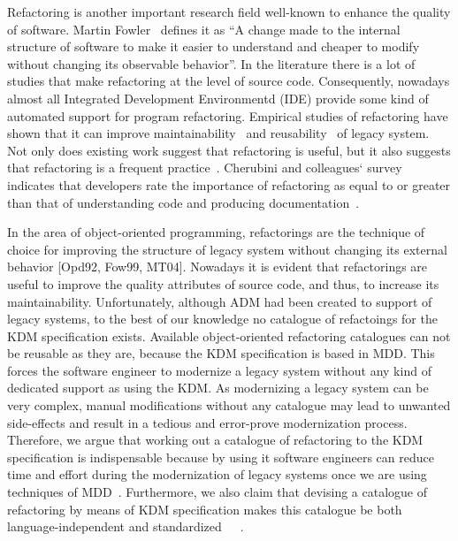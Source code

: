 Refactoring is another important research field well-known to enhance the quality of software. Martin Fowler~\cite{refactImpro} defines it as ``A change made to the internal structure of software to make it easier to understand and cheaper to modify without changing its observable behavior''. In the literature there is a lot of studies that make refactoring at the level of source code. Consequently, nowadays almost all Integrated Development Environmentd (IDE) provide some kind of automated support for program refactoring. Empirical studies of refactoring have shown that it can improve maintainability~\cite{1510132} and reusability~\cite{Moser:2006} of legacy system. Not only does existing work suggest that refactoring is useful, but it also suggests that refactoring is a frequent practice~\cite{Murphy:2011}. Cherubini and colleagues` survey indicates that developers rate the importance of refactoring as equal to or greater than that of understanding code and producing documentation~\cite{Cherubini:2007}.


In the area of object-oriented programming, refactorings are the technique of choice for improving the structure of legacy system without changing its external behavior [Opd92, Fow99, MT04]. Nowadays it is evident that refactorings are useful to improve the quality attributes of source code, and thus, to increase its maintainability. Unfortunately, although ADM had been created to support  of legacy systems, to the best of our knowledge no catalogue of refactoings for the KDM specification exists. Available object-oriented refactoring catalogues can not be reusable as they are, because the KDM specification is based in MDD. This forces the software engineer to modernize a legacy system without any kind of dedicated support as using the KDM. As modernizing a legacy system can be very complex, manual modifications without any catalogue may lead to unwanted side-effects and result in a tedious and error-prove modernization process. Therefore, we argue that working out a catalogue of refactoring to the KDM specification is indispensable because by using it software engineers can reduce time and effort during the  modernization of legacy systems once we are using techniques of MDD~\cite{ThomasMDD, Ambler}. Furthermore, we also claim that devising a catalogue of refactoring by means of KDM specification makes this catalogue be both language-independent and standardized~\cite{Deltombe}~\cite{Castillo2012126}~\cite{Mainetti2012490}.     



